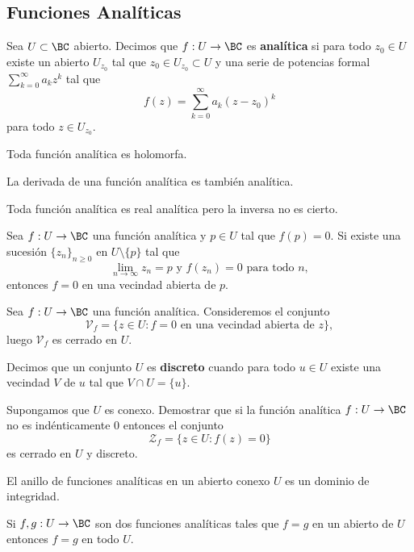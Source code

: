 \subsection{Funciones Anal\'iticas}

Sea $U \subset \BC$ abierto. Decimos que $f: U \to \BC$ es \textbf{anal\'itica} si para todo $z_0 \in U$
existe un abierto $U_{z_0}$ tal que $z_0 \in U_{z_0} \subset U$ y una serie de potencias formal
$\sum_{k = 0}^{\infty} a_k z^k$ tal que
\[
  f(z) = \sum_{k = 0}^{\infty} a_k (z - z_0)^k
\]
para todo $z \in U_{z_0}$.

\begin{theorem}
  Toda funci\'on anal\'itica es holomorfa.
\end{theorem}

\begin{theorem}
  La derivada de una funci\'on anal\'itica es tambi\'en anal\'itica.
\end{theorem}

\begin{remark}
  Toda funci\'on anal\'itica es real anal\'itica pero la inversa no es cierto.
\end{remark}

\begin{theorem}
  Sea $f: U \to \BC$ una funci\'on anal\'itica y $p \in U$ tal que $f(p) = 0$. Si
  existe una sucesi\'on $\{z_n\}_{n \geq 0}$ en $U \setminus \{p\}$ tal que
  \[
    \lim_{n \to \infty} z_n = p \text{ y } f(z_n) = 0 \text{ para todo $n$},
  \]
  entonces $f = 0$ en una vecindad abierta de $p$.
\end{theorem}

\begin{theorem}
  Sea $f: U \to \BC$ una funci\'on anal\'itica. Consideremos el conjunto
  \[
    \mathcal{V}_f = \{z \in U : f = 0 \text{ en una vecindad abierta de } z\},
  \]
  luego $\mathcal{V}_f$ es cerrado en $U$.
\end{theorem}

Decimos que un conjunto $U$ es \textbf{discreto} cuando para todo $u \in U$ existe
una vecindad $V$ de $u$ tal que $V \cap U = \{u\}$.

\begin{theorem}
  Supongamos que $U$ es conexo. Demostrar que si la funci\'on anal\'itica
  $f: U \to \BC$ no es ind\'enticamente $0$ entonces el conjunto
  \[
    \mathcal{Z}_f = \{z \in U: f(z) = 0\}  
  \]
  es cerrado en $U$ y discreto.
\end{theorem}

\begin{theorem}
  El anillo de funciones anal\'iticas en un abierto conexo $U$ es un dominio de integridad.
\end{theorem}

\begin{theorem}
  Si $f, g: U \to \BC$ son dos funciones anal\'iticas tales que $f = g$ en un abierto de $U$
  entonces $f = g$ en todo $U$.
\end{theorem}